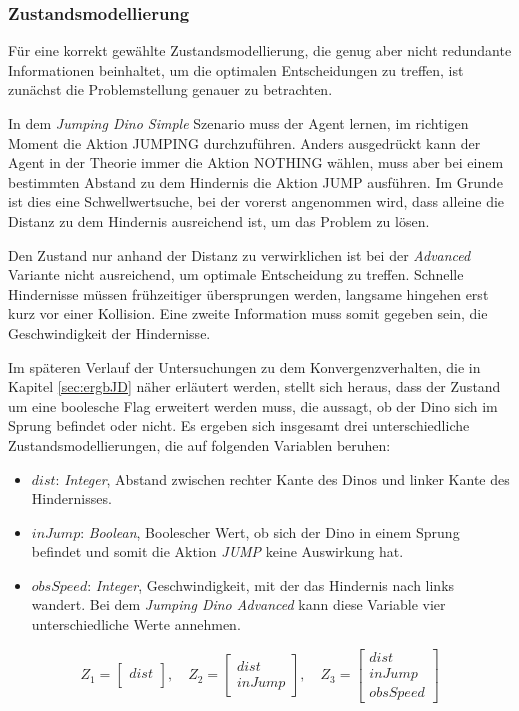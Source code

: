 \subsubsection{Zustandsmodellierung}\label{sec:JDzustandsmodellierung}
Für eine korrekt gewählte Zustandsmodellierung, die genug aber nicht redundante Informationen beinhaltet, um die optimalen Entscheidungen zu treffen, ist zunächst die Problemstellung genauer zu betrachten. 
\par 
In dem \textit{Jumping Dino Simple} Szenario muss der Agent lernen, im richtigen Moment die Aktion JUMPING durchzuführen. Anders ausgedrückt kann der Agent in der Theorie immer die Aktion NOTHING wählen, muss aber bei einem bestimmten Abstand zu dem Hindernis die Aktion JUMP ausführen. Im Grunde ist dies eine Schwellwertsuche, bei der vorerst angenommen wird, dass alleine die Distanz zu dem Hindernis ausreichend ist, um das Problem zu lösen.
\par 
Den Zustand nur anhand der Distanz zu verwirklichen ist bei der \textit{Advanced} Variante nicht ausreichend, um optimale Entscheidung zu treffen. Schnelle Hindernisse müssen frühzeitiger übersprungen werden, langsame hingehen erst kurz vor einer Kollision. Eine zweite Information muss somit gegeben sein, die Geschwindigkeit der Hindernisse.
\par 
Im späteren Verlauf der Untersuchungen zu dem Konvergenzverhalten, die in Kapitel \ref{sec:ergbJD} näher erläutert werden, stellt sich heraus, dass der Zustand um eine boolesche Flag erweitert werden muss, die aussagt, ob der Dino sich im Sprung befindet oder nicht. 
Es ergeben sich insgesamt drei unterschiedliche Zustandsmodellierungen, die auf folgenden Variablen beruhen:
\begin{itemize}
 \item $dist$: \textit{Integer}, Abstand zwischen rechter Kante des Dinos und  linker Kante des Hindernisses.
 \item $inJump$: \textit{Boolean}, Boolescher Wert, ob sich der Dino in einem Sprung befindet und somit die Aktion \textit{JUMP} keine Auswirkung hat.
 \item $obsSpeed$: \textit{Integer}, Geschwindigkeit, mit der das Hindernis nach links wandert. Bei dem \textit{Jumping Dino Advanced} kann diese Variable vier unterschiedliche Werte annehmen.    
\end{itemize}
\begin{equation}
    Z_{1} =  \begin{bmatrix} dist\\   \end{bmatrix}, \quad
    Z_{2} =  \begin{bmatrix} dist \\ inJump   \end{bmatrix}, \quad
    Z_{3} =  \begin{bmatrix} dist \\ inJump \\ obsSpeed   \end{bmatrix}
\end{equation}

